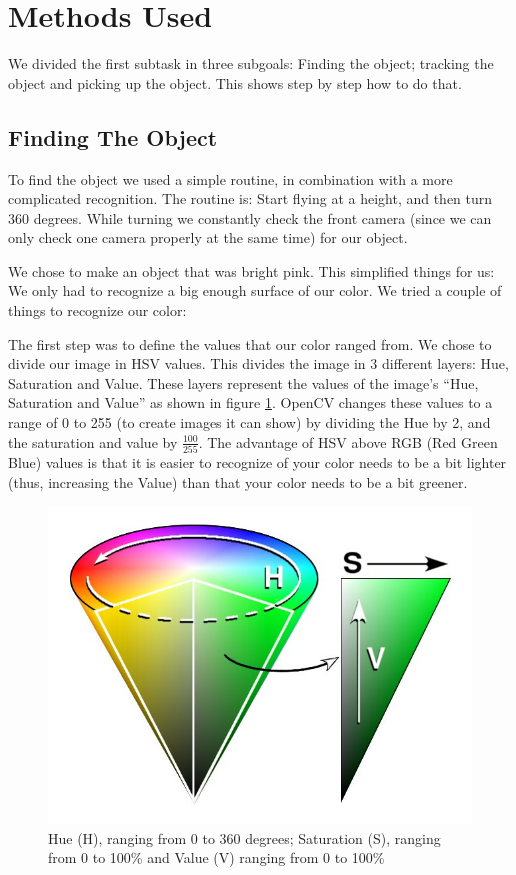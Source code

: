 \section{Methods Used}
We divided the first subtask in three subgoals: Finding the object; tracking the object and picking up the object. This shows step by step how to do that.

\subsection{Finding The Object}
To find the object we used a simple routine, in combination with a more complicated recognition. The routine is: Start flying at a height, and then turn 360 degrees. While turning we constantly check the front camera (since we can only check one camera properly at the same time) for our object.

We chose to make an object that was bright pink. This simplified things for us: We only had to recognize a big enough surface of our color. We tried a couple of things to recognize our color:

The first step was to define the values that our color ranged from. We chose to divide our image in HSV values. This divides the image in 3 different layers: Hue, Saturation and Value. These layers represent the values of the image's ``Hue, Saturation and Value'' as shown in figure \ref{HSV}. OpenCV changes these values to a range of 0 to 255 (to create images it can show) by dividing the Hue by 2, and the saturation and value by $\frac{100}{255}$. The advantage of HSV above RGB (Red Green Blue) values is that it is easier to recognize of your color needs to be a bit lighter (thus, increasing the Value) than that your color needs to be a bit greener.

\begin{figure}
  \centering
      \includegraphics[scale=0.35]{HSV.jpg}
  \caption{Hue (H), ranging from 0 to 360 degrees; Saturation (S), ranging from 0 to 100\% and Value (V) ranging from 0 to 100\% }
  \label{HSV}
\end{figure}

